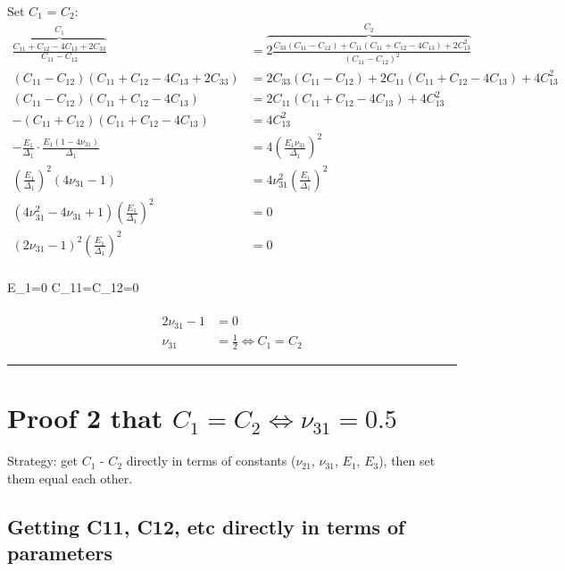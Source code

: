 \documentclass{article}
\begin{document}
Set $C_1$ = $C_2$:
\begin{align}
\overbrace{\frac{C_{11} +C_{12} -4C_{13} +2C_{33}}{C_{11}-C_{12}}}^{C_1}
 &= \overbrace{ 2 \frac{C_{33} \left( C_{11} - C_{12} \right) + C_{11} \left( C_{11}+C_{12}-4C_{13} \right) + 2C_{13}^2 }{\left( C_{11}-C_{12} \right)^2} }^{C_2}  \\
\left( C_{11}-C_{12} \right) \left( C_{11} +C_{12} -4C_{13} +2C_{33} \right) &= 2 C_{33} \left( C_{11} - C_{12} \right) + 2 C_{11} \left( C_{11}+C_{12}-4C_{13} \right) + 4 C_{13}^2   \\
\left( C_{11}-C_{12} \right) \left( C_{11} +C_{12} -4C_{13} \right) &=  2 C_{11} \left( C_{11}+C_{12}-4C_{13} \right) + 4 C_{13}^2  \\
-\left( C_{11}+C_{12} \right) \left( C_{11} +C_{12} -4C_{13} \right) &=  4 C_{13}^2  \\
- \frac{E_1}{\Delta_1} \cdot \frac{E_1 \left(1-4\nu_{31} \right)}{\Delta_1} &= 4 \left( \frac{E_1 \nu_{31}}{\Delta_1} \right)^2 \\
\left( \frac{E_1}{\Delta_1} \right)^2 \left(4\nu_{31}-1 \right) &= 4 \nu_{31}^2 \left( \frac{E_1}{\Delta_1} \right)^2 \\
\left( 4 \nu_{31}^2 -4 \nu_{31} +1 \right) \left( \frac{E_1}{\Delta_1} \right)^2 &= 0 \\
\left( 2 \nu_{31} -1 \right)^2 \left( \frac{E_1}{\Delta_1} \right)^2 &= 0 \\
\end{align}


 E_1=0   C_{11}=C_{12}=0 \\
 \\ 
\begin{align}
2 \nu_{31} -1 &= 0 \\
\nu_{31} &= \frac{1}{2}  \iff C_1=C_2
\end{align}

\noindent\rule{20cm}{0.8pt}

\newpage 
\section{Proof 2 that $C_1\!=\!C_2 \iff \nu_{31}\!=\!0.5$}

Strategy: get $C_1$ - $C_2$ directly in terms of constants ($\nu_{21}$, $\nu_{31}$, $E_1$, $E_3$), then set them equal each other.

\subsection{Getting C11, C12, etc directly in terms of parameters}
\end{document}
